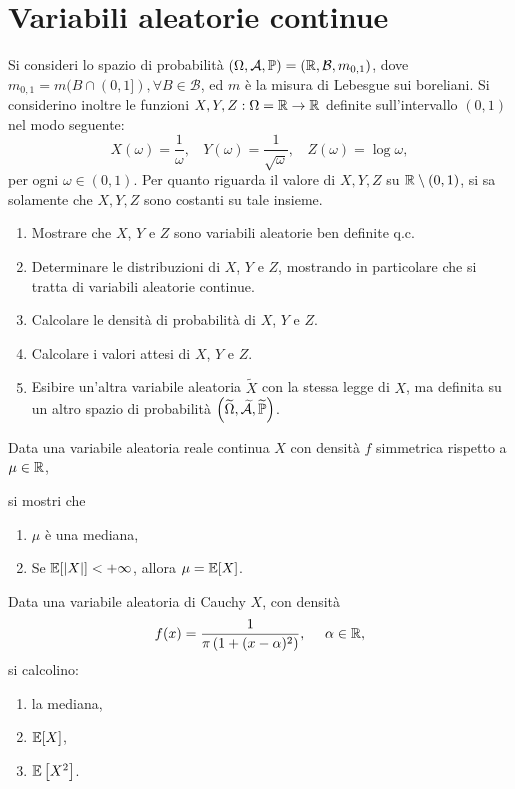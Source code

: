 
\chapter{Variabili aleatorie continue}

\ParteEsercizi
\Esercizio{}

Si consideri lo spazio di probabilità $(\Omega,\mathcal{A},\mathbb{P}) =(\mathbb{R} ,\mathcal{B} ,m_{0,1})$, dove $m_{0,1} =m(B\cap (0,1]) ,\forall B\in \mathcal{B}$, ed $m$ è la misura di Lebesgue sui boreliani. Si considerino inoltre le funzioni $X,Y,Z:\Omega =\mathbb{R}\rightarrow \mathbb{R}$ definite sull'intervallo $(0,1)$ nel modo seguente:
\begin{equation*}
X(\omega) =\frac{1}{\omega } ,\ \ \ \ Y(\omega) =\frac{1}{\sqrt{\omega }} ,\ \ \ \ Z(\omega) =\log \omega ,
\end{equation*}
per ogni $\omega \in (0,1)$. Per quanto riguarda il valore di $X,Y,Z$ su $\mathbb{R} \setminus (0,1)$, si sa solamente che $X,Y,Z$ sono costanti su tale insieme.
\begin{enumerate}
\item Mostrare che $X$, $Y$ e $Z$ sono variabili aleatorie ben definite q.c.
\item Determinare le distribuzioni di $X$, $Y$ e $Z$, mostrando in particolare che si tratta di variabili aleatorie continue.
\item Calcolare le densità di probabilità di $X$, $Y$ e $Z$.
\item Calcolare i valori attesi di $X$, $Y$ e $Z$.
\item Esibire un'altra variabile aleatoria $\tilde{X}$ con la stessa legge di $X$, ma definita su un altro spazio di probabilità $\left(\widetilde{\Omega } ,\widetilde{\mathcal{A}} ,\widetilde{\mathbb{P}}\right)$.
\end{enumerate}
\Esercizio{}

Data una variabile aleatoria reale continua $X$ con densità $f$ simmetrica rispetto a $\mu \in \mathbb{R}$,

si mostri che
\begin{enumerate}
\item $\mu $ è una mediana,
\item Se $\mathbb{E}[|X|] < +\infty $, allora $\mu =\mathbb{E}[X]$.
\end{enumerate}

Data una variabile aleatoria di Cauchy $X$, con densità
\begin{equation*}
f(x) =\frac{1}{\pi \left(1+(x-\alpha)^{2}\right)} ,\ \ \ \ \alpha \in \mathbb{R} ,
\end{equation*}
si calcolino:
\begin{enumerate}
\item la mediana,
\item $\mathbb{E}[X]$,
\item $\mathbb{E}\left[X^{2}\right]$.
\end{enumerate}
\Esercizio{$\star$}

